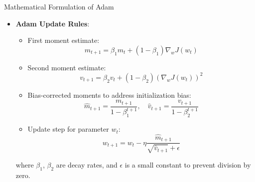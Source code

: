 \documentclass[serif, aspectratio=169]{beamer}
\begin{document}
\begin{frame}{Mathematical Formulation of Adam}
    \begin{itemize}
        \item \textbf{Adam Update Rules}:
        \begin{itemize}
            \item First moment estimate:
            \[
            m_{t+1} = \beta_1 m_t + (1 - \beta_1) \nabla_w J(w_t)
            \]
            \item Second moment estimate:
            \[
            v_{t+1} = \beta_2 v_t + (1 - \beta_2) (\nabla_w J(w_t))^2
            \]
            \item Bias-corrected moments to address initialization bias:
            \[
            \hat{m}_{t+1} = \frac{m_{t+1}}{1 - \beta_1^{t+1}}, \quad 
            \hat{v}_{t+1} = \frac{v_{t+1}}{1 - \beta_2^{t+1}}
            \]
            \item Update step for parameter \( w_t \):
            \[
            w_{t+1} = w_t - \eta \frac{\hat{m}_{t+1}}{\sqrt{\hat{v}_{t+1}} + \epsilon}
            \]
        \end{itemize}
        where \(\beta_1\), \(\beta_2\) are decay rates, and \(\epsilon\) is a small constant to prevent division by zero.
    \end{itemize}
\end{frame}

\end{document}
